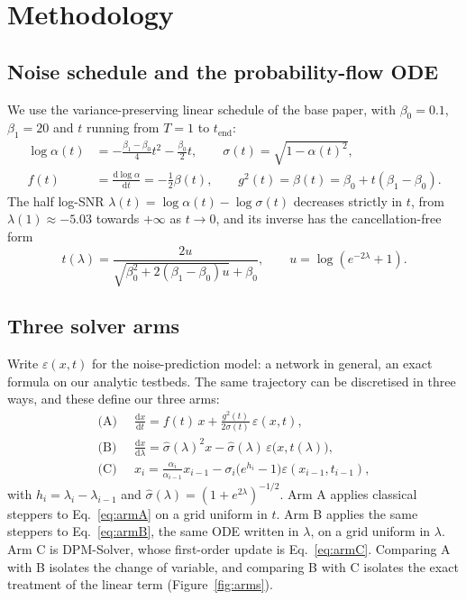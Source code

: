 \documentclass[sigconf]{acmart}
\newcommand{\eps}{\varepsilon}
\newcommand{\lam}{\lambda}
\newcommand{\tend}{t_{\text{end}}}
\begin{document}
\section{Methodology}

\subsection{Noise schedule and the probability-flow ODE}

We use the variance-preserving linear schedule of the base paper, with
$\beta_0=0.1$, $\beta_1=20$ and $t$ running from $T=1$ to $\tend$:
\begin{align}
\log\alpha(t) &= -\tfrac{\beta_1-\beta_0}{4}t^2-\tfrac{\beta_0}{2}t,
 \qquad \sigma(t)=\sqrt{1-\alpha(t)^2},\\
f(t) &= \tfrac{\mathrm{d}\log\alpha}{\mathrm{d}t} = -\tfrac12\beta(t),
 \qquad g^2(t)=\beta(t)=\beta_0+t(\beta_1-\beta_0).
\end{align}
The half log-SNR $\lam(t)=\log\alpha(t)-\log\sigma(t)$ decreases strictly in
$t$, from $\lam(1)\approx-5.03$ towards $+\infty$ as $t\to0$, and its inverse
has the cancellation-free form
\begin{equation}
t(\lam)=\frac{2u}{\sqrt{\beta_0^2+2(\beta_1-\beta_0)u}+\beta_0},
\qquad u=\log\!\left(e^{-2\lam}+1\right).
\end{equation}

\subsection{Three solver arms}

Write $\eps(x,t)$ for the noise-prediction model: a network in general, an
exact formula on our analytic testbeds. The same trajectory can be
discretised in three ways, and these define our three arms:
\begin{align}
\text{(A)}\;\; &\frac{\mathrm{d}x}{\mathrm{d}t}=f(t)\,x+\frac{g^2(t)}{2\sigma(t)}\,\eps(x,t),
  \label{eq:armA}\\
\text{(B)}\;\; &\frac{\mathrm{d}x}{\mathrm{d}\lam}=\hat\sigma(\lam)^2x-\hat\sigma(\lam)\,\eps\big(x,t(\lam)\big),
  \label{eq:armB}\\
\text{(C)}\;\; &x_i=\frac{\alpha_i}{\alpha_{i-1}}x_{i-1}-\sigma_i\big(e^{h_i}-1\big)\eps(x_{i-1},t_{i-1}),
  \label{eq:armC}
\end{align}
with $h_i=\lam_i-\lam_{i-1}$ and $\hat\sigma(\lam)=(1+e^{2\lam})^{-1/2}$.
Arm A applies classical steppers to Eq.~\eqref{eq:armA} on a grid uniform in
$t$. Arm B applies the same steppers to Eq.~\eqref{eq:armB}, the same ODE
written in $\lam$, on a grid uniform in $\lam$. Arm C is DPM-Solver, whose
first-order update is Eq.~\eqref{eq:armC}. Comparing A with B isolates the
change of variable, and comparing B with C isolates the exact treatment of the
linear term (Figure~\ref{fig:arms}).
\end{document}
